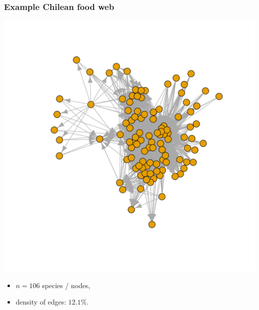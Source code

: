 \documentclass[compress,10pt]{beamer}
\begin{document}


\begin{frame}
 \frametitle{Example Chilean food web}
 
\begin{center}
\includegraphics[scale=.3]{plots/chilean_food_web.pdf} 
\end{center}

\begin{itemize}
 \item $n=106$ species / nodes,
 \item density of edges: $12.1\%$.
\end{itemize}


\textcolor{mygreen}{\cite{kefi}}

\end{frame}
\end{document}
